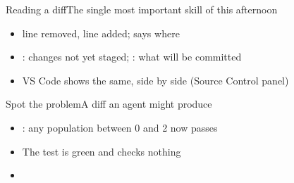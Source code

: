 \begin{frame}{Reading a diff}{The single most important skill of this afternoon}
  \vspace{1ex}
  \begin{diffblock}
  \end{diffblock}
  \vspace{2ex}

  \begin{itemize}
    \item \textcolor{unibasRed}{\cmd{-}} line removed, \textcolor{unibasPetrol}{\cmd{+}} line
          added;  says where
    \item<2-> : changes not yet staged; : what will be committed
    \item<3-> VS Code shows the same, side by side (Source Control panel)
  \end{itemize}
\end{frame}

\begin{frame}{Spot the problem}{A diff an agent might produce}
  \vspace{1ex}
  \begin{diffblock}
  \end{diffblock}
  \vspace{2ex}

  \begin{itemize}
    \item<2-> : any population between 0 and 2 now passes
    \item<3-> The test is green and checks nothing
    \item<4-> 
  \end{itemize}
\end{frame}

